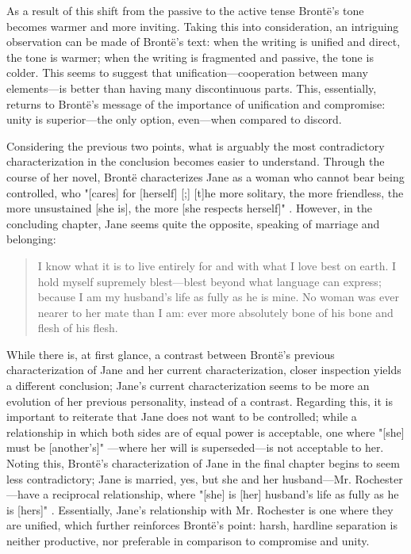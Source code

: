 \documentclass[a4paper,12pt]{article}
\begin{document}
\begin{flushleft}
\begin{quote}
            \cite[236]{brontec}
        \end{quote}
        As a result of this shift from the passive to the active tense Brontë’s tone becomes warmer
        and more inviting. Taking this into consideration, an intriguing observation can be made of
        Brontë’s text: when the writing is unified and direct, the tone is warmer; when the writing
        is fragmented and passive, the tone is colder. This seems to suggest that
        unification—cooperation between many elements—is better than having many discontinuous
        parts. This, essentially, returns to Brontë’s message of the importance of unification and
        compromise: unity is superior—the only option, even—when compared to discord.

        Considering the previous two points, what is arguably the most contradictory
        characterization in the conclusion becomes easier to understand. Through the course of her
        novel, Brontë characterizes Jane as a woman who cannot bear being controlled, who "[cares]
        for [herself] [;] [t]he more solitary, the more friendless, the more unsustained [she is],
        the more [she respects herself]" \cite[366]{brontec}.   However, in the concluding chapter, Jane
        seems quite the opposite, speaking of marriage and belonging:
        \begin{quote}
            I know what it is to live entirely for and with what I love best on earth. I hold myself
            supremely blest—blest beyond what language can express; because I am my husband’s life
            as fully as he is mine. No woman was ever nearer to her mate than I am: ever more
            absolutely bone of his bone and flesh of his flesh.

            \cite[523]{brontec}
        \end{quote}
        While there is, at first glance, a contrast between Brontë’s previous characterization of
        Jane and her current characterization, closer inspection yields a different conclusion;
        Jane’s current characterization seems to be more an evolution of her previous personality,
        instead of a contrast. Regarding this, it is important to reiterate that Jane does not want
        to be controlled; while a relationship in which both sides are of equal power is acceptable,
        one where "[she] must be [another’s]" \cite[364]{brontec}—where her will is superseded—is not
        acceptable to her. Noting this, Brontë’s characterization of Jane in the final chapter
        begins to seem less contradictory; Jane is married, yes, but she and her husband—Mr.
        Rochester—have a reciprocal relationship, where "[she] is [her] husband’s life as fully as
        he is [hers]" \cite[523]{brontec}. Essentially, Jane’s relationship with Mr. Rochester is one where
        they are unified, which further reinforces Brontë’s point: harsh, hardline separation is
        neither productive, nor preferable in comparison to compromise and unity.


\end{flushleft}
\end{document}
